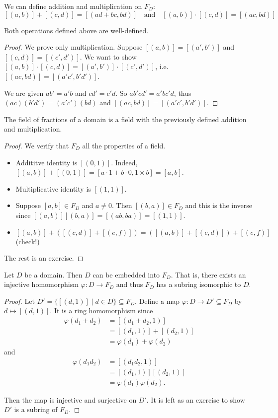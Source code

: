 We can define addition and multiplication on $F_D$:
$$[(a,b)]+[(c,d)]=[(ad+bc,bd)]\quad\text{and}\quad[(a,b)]\cdot[(c,d)]=[(ac,bd)]$$

\begin{lemma}
	Both operations defined above are well-defined.
\end{lemma}

\begin{proof}
	We prove only multiplication. Suppose $[(a,b)]=[(a',b')]$ and $[(c,d)]=[(c',d')]$. We want to show $[(a,b)]\cdot[(c,d)]=[(a',b')]\cdot[(c',d')]$, i.e. $[(ac,bd)]=[(a'c',b'd')]$.

	We are given $ab'=a'b$ and $cd'=c'd$. So $ab'cd'=a'bc'd$, thus $(ac)(b'd')=(a'c')(bd)$ and $[(ac,bd)]=[(a'c',b'd')]$.
\end{proof}

\begin{theorem}
	The field of fractions of a domain is a field with the previously defined addition and multiplication.
\end{theorem}

\begin{proof}
	We verify that $F_D$ all the properties of a field.
	\begin{itemize}
		\item Addititve identity is $[(0,1)]$. Indeed, $[(a,b)]+[(0,1)]=[a\cdot 1+b\cdot 0,1\times b]=[a,b]$.
		\item Multiplicative identity is $[(1,1)]$.
		\item Suppose $[a,b]\in F_D$ and $a\neq 0$. Then $[(b,a)]\in F_D$ and this is the inverse since $[(a,b)][(b,a)]=[(ab,ba)]=[(1,1)]$.
		\item $[(a,b)]+([(c,d)]+[(e,f)])=([(a,b)]+[(c,d)])+[(e,f)]$ (check!)
	\end{itemize}
	The rest is an exercise.
\end{proof}

\begin{theorem}
	Let $D$ be a domain. Then $D$ can be embedded into $F_D$. That is, there exists an injective homomorphism $\varphi\colon D\to F_D$ and thus $F_D$ has a subring isomorphic to $D$.
\end{theorem}

\begin{proof}
	Let $D'=\{[(d,1)]\mid d\in D\}\subseteq F_D$. Define a map $\varphi \colon D\to D'\subseteq F_D$ by $d\mapsto [(d,1)]$. It is a ring homomorphism since
	\begin{align*}
		\varphi(d_1+d_2)&=[(d_1+d_2,1)]\\
		&=[(d_1,1)]+[(d_2,1)]\\
		&=\varphi(d_1)+\varphi(d_2)
	\end{align*}
	and
	\begin{align*}
		\varphi(d_1d_2)&=[(d_1d_2,1)]\\
		&=[(d_1,1)][(d_2,1)]\\
		&=\varphi(d_1)\varphi(d_2).
	\end{align*}

	Then the map is injective and surjective on $D'$. It is left as an exercise to show $D'$ is a subring of $F_D$.
\end{proof}


